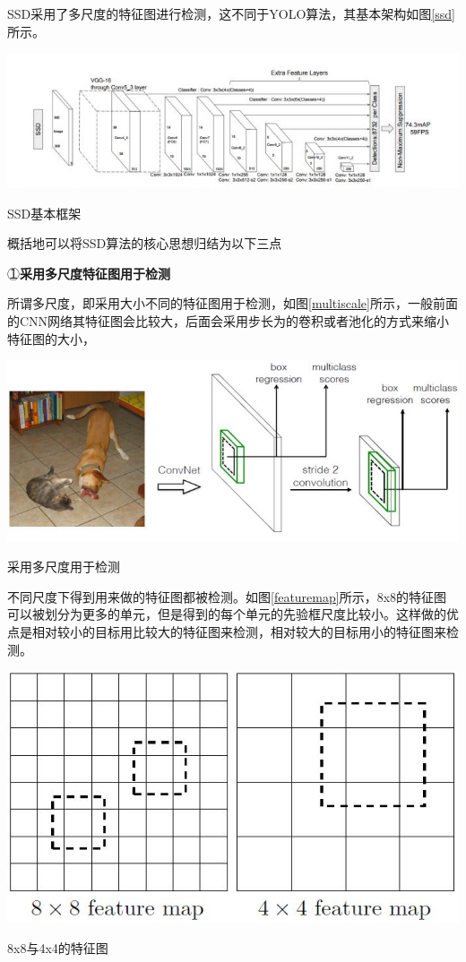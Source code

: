 SSD采用了多尺度的特征图进行检测，这不同于YOLO算法，其基本架构如图\ref{ssd}所示。
\begin{uscfigure}
	\includegraphics[width=\textwidth]{./Pictures/ssd_model.jpg}	
	\caption{SSD基本框架}
	\label{ssd}
\end{uscfigure}


概括地可以将SSD算法的核心思想归结为以下三点

\textcircled{１}\textbf{采用多尺度特征图用于检测 }

所谓多尺度，即采用大小不同的特征图用于检测，如图\ref{multiscale}所示，一般前面的CNN网络其特征图会比较大，后面会采用步长为的卷积或者池化的方式来缩小特征图的大小，
\begin{uscfigure}
	\includegraphics[width=\textwidth]{./Pictures/ssd_(1).jpg}	
	\caption{采用多尺度用于检测}
	\label{multiscale}
\end{uscfigure}
不同尺度下得到用来做的特征图都被检测。如图\ref{featuremap}所示，8x8的特征图可以被划分为更多的单元，但是得到的每个单元的先验框尺度比较小。这样做的优点是相对较小的目标用比较大的特征图来检测，相对较大的目标用小的特征图来检测。
\begin{uscfigure}
	\includegraphics[width=\textwidth]{./Pictures/ssd_(2).jpg}	
	\caption{8x8与4x4的特征图}
	\label{featuremap}
\end{uscfigure}


